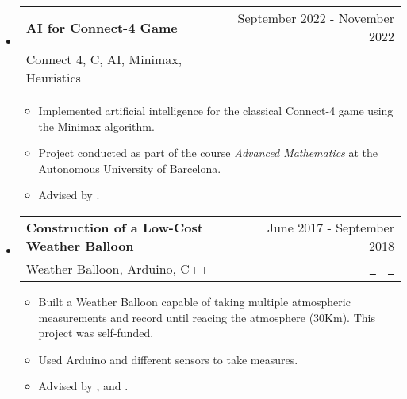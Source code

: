 \documentclass[a4paper,11pt,dvipsnames]{article}
\makeatletter
\newcommand{\resumeQuadHeading}[4]{
	\item
	\begin{tabular*}{0.96\textwidth}[t]{l@{\extracolsep{\fill}}r}
		\textbf{#1} & \small #2 \\
		\small#3 & \small #4 \\
	\end{tabular*}
}
\newcommand{\resumeHeadingListStart}{
	\begin{itemize}[leftmargin=0.15in, label={}]
	}
\newcommand{\resumeHeadingListEnd}{\end{itemize}}
\makeatother
\begin{document}
	\resumeHeadingListStart{}
	\resumeQuadHeading{AI for Connect-4 Game}{September 2022 - November 2022}{Connect 4, C, AI, Minimax, Heuristics}{\href{https://github.com/Tutusaus/4_en_Ratlla}{\faGithub \ \graydotuline{Code}}}
	\begin{itemize}[leftmargin=3em, itemsep=0.1em, topsep=2pt]
		\item \small Implemented artificial intelligence for the classical Connect-4 game using the Minimax algorithm.
		\item \small Project conducted as part of the course \textit{Advanced Mathematics} at the Autonomous University of Barcelona.
		\item \small Advised by \href{https://portalrecerca.uab.cat/en/persons/vicente-soler-ruz}{}.
	\end{itemize}
	\resumeHeadingListEnd{}
	
	\resumeHeadingListStart{}
	\resumeQuadHeading{Construction of a Low-Cost Weather Balloon}{June 2017 - September 2018}{Weather Balloon, Arduino, C++}{\href{https://guillemtutusausalcaraz.weebly.com/weatherballoon.html}{\faFileTextO \ \graydotuline{Report}} $ | $ \href{https://github.com/Tutusaus/Weather-Balloon}{\faGithub \ \graydotuline{Code}}}
	\begin{itemize}[leftmargin=3em, itemsep=0.1em, topsep=2pt]
		\item \small Built a Weather Balloon capable of taking multiple atmospheric measurements and record until reacing the atmosphere (30Km). This project was self-funded.
		\item \small Used Arduino and different sensors to take measures.
		\item \small Advised by \href{https://www.linkedin.com/in/ingrid-mu%C3%B1oz-fern%C3%A1ndez-07796920/?originalSubdomain=es}{\graydotuline{Íngrid Muñoz}}, \href{https://www.linkedin.com/in/joshua-tristancho-%E5%90%89-b2444517/}{\graydotuline{Joshua Tristancho}} and  \href{https://www.linkedin.com/in/n%C3%BAria-sal%C3%A1n-1820b71b/}{\graydotuline{Núria Salán}}.
	\end{itemize}
	\resumeHeadingListEnd{}
	
	
	
\end{document}
